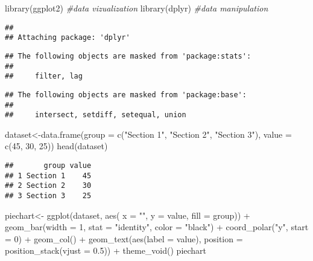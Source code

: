 \documentclass[
]{article}
\newenvironment{Shaded}{\begin{snugshade}}{\end{snugshade}}
\newcommand{\AttributeTok}[1]{\textcolor[rgb]{0.77,0.63,0.00}{#1}}
\newcommand{\CommentTok}[1]{\textcolor[rgb]{0.56,0.35,0.01}{\textit{#1}}}
\newcommand{\DecValTok}[1]{\textcolor[rgb]{0.00,0.00,0.81}{#1}}
\newcommand{\FloatTok}[1]{\textcolor[rgb]{0.00,0.00,0.81}{#1}}
\newcommand{\FunctionTok}[1]{\textcolor[rgb]{0.00,0.00,0.00}{#1}}
\newcommand{\NormalTok}[1]{#1}
\newcommand{\OtherTok}[1]{\textcolor[rgb]{0.56,0.35,0.01}{#1}}
\newcommand{\SpecialCharTok}[1]{\textcolor[rgb]{0.00,0.00,0.00}{#1}}
\newcommand{\StringTok}[1]{\textcolor[rgb]{0.31,0.60,0.02}{#1}}
\begin{document}
\begin{Shaded}
\begin{Highlighting}[]
\FunctionTok{library}\NormalTok{(ggplot2) }\CommentTok{\#data vizualization}
\FunctionTok{library}\NormalTok{(dplyr) }\CommentTok{\#data manipulation}
\end{Highlighting}
\end{Shaded}

\begin{verbatim}
## 
## Attaching package: 'dplyr'
\end{verbatim}

\begin{verbatim}
## The following objects are masked from 'package:stats':
## 
##     filter, lag
\end{verbatim}

\begin{verbatim}
## The following objects are masked from 'package:base':
## 
##     intersect, setdiff, setequal, union
\end{verbatim}

\begin{Shaded}
\begin{Highlighting}[]
\NormalTok{dataset}\OtherTok{\textless{}{-}}\FunctionTok{data.frame}\NormalTok{(}\AttributeTok{group =} \FunctionTok{c}\NormalTok{(}\StringTok{"Section 1"}\NormalTok{, }\StringTok{"Section 2"}\NormalTok{, }\StringTok{"Section 3"}\NormalTok{), }\AttributeTok{value =} \FunctionTok{c}\NormalTok{(}\DecValTok{45}\NormalTok{, }\DecValTok{30}\NormalTok{, }\DecValTok{25}\NormalTok{))}
\FunctionTok{head}\NormalTok{(dataset)}
\end{Highlighting}
\end{Shaded}

\begin{verbatim}
##       group value
## 1 Section 1    45
## 2 Section 2    30
## 3 Section 3    25
\end{verbatim}

\begin{Shaded}
\begin{Highlighting}[]
\NormalTok{piechart}\OtherTok{\textless{}{-}} \FunctionTok{ggplot}\NormalTok{(dataset, }\FunctionTok{aes}\NormalTok{( }\AttributeTok{x =} \StringTok{""}\NormalTok{, }\AttributeTok{y =}\NormalTok{ value, }\AttributeTok{fill =}\NormalTok{ group)) }\SpecialCharTok{+} \FunctionTok{geom\_bar}\NormalTok{(}\AttributeTok{width =} \DecValTok{1}\NormalTok{, }\AttributeTok{stat =} \StringTok{"identity"}\NormalTok{, }\AttributeTok{color =} \StringTok{"black"}\NormalTok{) }\SpecialCharTok{+} \FunctionTok{coord\_polar}\NormalTok{(}\StringTok{"y"}\NormalTok{, }\AttributeTok{start =} \DecValTok{0}\NormalTok{) }\SpecialCharTok{+} \FunctionTok{geom\_col}\NormalTok{() }\SpecialCharTok{+} \FunctionTok{geom\_text}\NormalTok{(}\FunctionTok{aes}\NormalTok{(}\AttributeTok{label =}\NormalTok{ value), }\AttributeTok{position =} \FunctionTok{position\_stack}\NormalTok{(}\AttributeTok{vjust =} \FloatTok{0.5}\NormalTok{)) }\SpecialCharTok{+} \FunctionTok{theme\_void}\NormalTok{()}
\NormalTok{piechart}
\end{Highlighting}
\end{Shaded}
\end{document}
